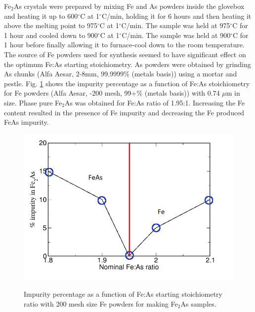 \documentclass[letterpaper,10pt,doublespacing,edeposit]{uiucthesis2020}
\begin{document}
\begin{mainmatter}
Fe$_2$As crystals were prepared by mixing Fe and As powders inside the glovebox and heating it up to 600$^\circ$C at 1$^\circ$C/min, holding it for 6 hours and then heating it above the melting point to 975$^\circ$C at 1$^\circ$C/min. The sample was held at 975$^\circ$C for 1 hour and cooled down to 900$^\circ$C at 1$^\circ$C/min. The sample was held at 900$^\circ$C for 1 hour before finally allowing it to furnace-cool down to the room temperature. The source of Fe powders used for synthesis seemed to have significant effect on the optimum Fe:As starting stoichiometry. As powders were obtained by grinding As chunks (Alfa Aesar, 2-8mm, 99.9999\% (metals basis)) using a mortar and pestle. Fig. \ref{fig:Fe2As_ratio_1} shows the impurity percentage as a function of Fe:As stoichiometry for Fe powders (Alfa Aesar, -200 mesh, 99+\% (metals basis)) with 0.74 $\mu$m in size. Phase pure Fe$_2$As was obtained for Fe:As ratio of 1.95:1. Increasing the Fe content resulted in the presence of Fe impurity and decreasing the Fe produced FeAs impurity.

\begin{figure}
\centering\includegraphics[width=0.5\columnwidth]{figures/ch3/Fe2As_ratio_1.png} \\
\caption{\label{fig:Fe2As_ratio_1}
Impurity percentage as a function of Fe:As starting stoichiometry ratio with 200 mesh size Fe powders for making Fe$_2$As samples.
}
\end{figure}


\end{mainmatter}
\end{document}
